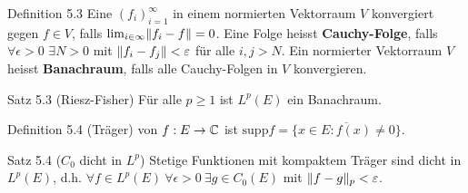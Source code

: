 \begin{namedtheorem}{Definition 5.3}
  Eine $(f_i)_{i=1}^{\infty}$ in einem normierten Vektorraum $V$ konvergiert gegen $f\in V$, falls $\lim_{i\in\infty}\lVert f_i-f\rVert=0$. Eine Folge heisst \textbf{Cauchy-Folge}, falls $\forall\epsilon>0$ $\exists N>0$ mit $\lVert f_i-f_j\rVert<\varepsilon$ für alle $i,j>N$. Ein normierter Vektorraum $V$ heisst \textbf{Banachraum}, falls alle Cauchy-Folgen in $V$ konvergieren.
\end{namedtheorem}

\begin{namedtheorem}{Satz 5.3 (Riesz-Fisher)}
  Für alle $p\geq1$ ist $L^p(E)$ ein Banachraum.
\end{namedtheorem}

\begin{namedtheorem}{Definition 5.4 (Träger)} 
  von $f:E\rightarrow\mathbb{C}$ ist $\mathrm{supp}f = \overline{\{x\in E: f(x)\neq0\}}$.
\end{namedtheorem}

\begin{namedtheorem}{Satz 5.4 ($C_0$ dicht in $L^p$)}
  Stetige Funktionen mit kompaktem Träger sind dicht in $L^p(E)$, d.h. $\forall f\in L^p(E)\ \forall\epsilon>0\ \exists g\in C_0(E)$ mit $\lVert f-g\rVert_p <\varepsilon$.
\end{namedtheorem}